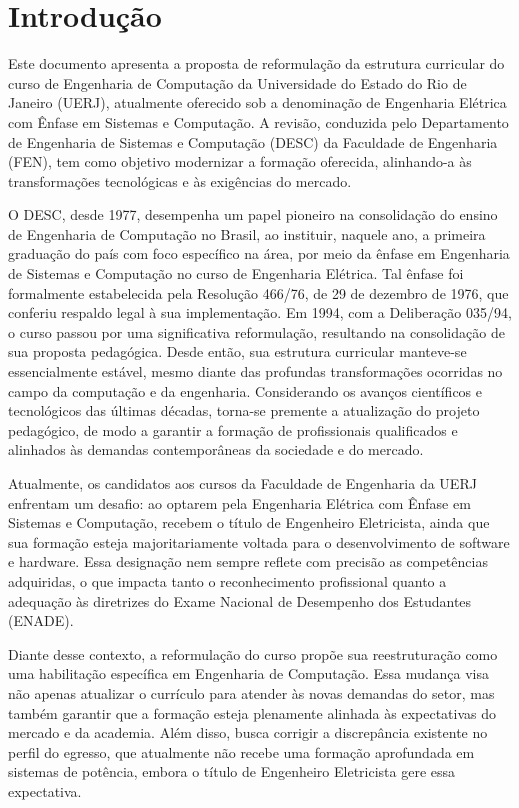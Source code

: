 \chapter{Introdução}
\thispagestyle{plain}
\label{intro} %

Este documento apresenta a proposta de reformulação da estrutura curricular do curso de Engenharia de Computação da Universidade do Estado do Rio de Janeiro (UERJ), atualmente oferecido sob a denominação de Engenharia Elétrica com Ênfase em Sistemas e Computação. A revisão, conduzida pelo Departamento de Engenharia de Sistemas e Computação (DESC) da Faculdade de Engenharia (FEN), tem como objetivo modernizar a formação oferecida, alinhando-a às transformações tecnológicas e às exigências do mercado.

O DESC, desde 1977, desempenha um papel pioneiro na consolidação do ensino de Engenharia de Computação no Brasil, ao instituir, naquele ano, a primeira graduação do país com foco específico na área, por meio da ênfase em Engenharia de Sistemas e Computação no curso de Engenharia Elétrica. Tal ênfase foi formalmente estabelecida pela Resolução  466/76, de 29 de dezembro de 1976, que conferiu respaldo legal à sua implementação. Em 1994, com a Deliberação  035/94, o curso passou por uma significativa reformulação, resultando na consolidação de sua proposta pedagógica. Desde então, sua estrutura curricular manteve-se essencialmente estável, mesmo diante das profundas transformações ocorridas no campo da computação e da engenharia. Considerando os avanços científicos e tecnológicos das últimas décadas, torna-se premente a atualização do projeto pedagógico, de modo a garantir a formação de profissionais qualificados e alinhados às demandas contemporâneas da sociedade e do mercado.

Atualmente, os candidatos aos cursos da Faculdade de Engenharia da UERJ enfrentam um desafio: ao optarem pela Engenharia Elétrica com Ênfase em Sistemas e Computação, recebem o título de Engenheiro Eletricista, ainda que sua formação esteja majoritariamente voltada para o desenvolvimento de software e hardware. Essa designação nem sempre reflete com precisão as competências adquiridas, o que impacta tanto o reconhecimento profissional quanto a adequação às diretrizes do Exame Nacional de Desempenho dos Estudantes (ENADE).

Diante desse contexto, a reformulação do curso propõe sua reestruturação como uma habilitação específica em Engenharia de Computação. Essa mudança visa não apenas atualizar o currículo para atender às novas demandas do setor, mas também garantir que a formação esteja plenamente alinhada às expectativas do mercado e da academia. Além disso, busca corrigir a discrepância existente no perfil do egresso, que atualmente não recebe uma formação aprofundada em sistemas de potência, embora o título de Engenheiro Eletricista gere essa expectativa.

